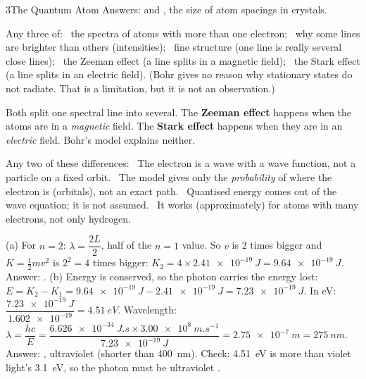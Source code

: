 \begin{chapteranswers}{3}{The Quantum Atom}
        Answers:  and
        , the size of atom spacings in crystals.
  \item Any three of:\newline
        \textbullet\ the spectra of atoms with more than one electron;\newline
        \textbullet\ why some lines are brighter than others (intensities);\newline
        \textbullet\ fine structure (one line is really several close lines);\newline
        \textbullet\ the Zeeman effect (a line splits in a magnetic field);\newline
        \textbullet\ the Stark effect (a line splits in an electric field).\newline
        (Bohr gives no reason why stationary states do not radiate. That is a limitation, but
        it is not an observation.)
  \item Both split one spectral line into several. The \textbf{Zeeman effect} happens when the
        atoms are in a \emph{magnetic} field. The \textbf{Stark effect} happens when they are in
        an \emph{electric} field. Bohr's model explains neither.
  \item Any two of these differences:\newline
        \textbullet\ The electron is a wave with a wave function, not a particle on a fixed
        orbit.\newline
        \textbullet\ The model gives only the \emph{probability} of where the electron is
        (orbitals), not an exact path.\newline
        \textbullet\ Quantised energy comes out of the wave equation; it is not assumed.\newline
        \textbullet\ It works (approximately) for atoms with many electrons, not only
        hydrogen.
  \item (a) For $n = 2$: $\lambda = \dfrac{2L}{2}$, half of the $n = 1$ value. So $v$ is 2
        times bigger and $K = \frac12 mv^2$ is $2^2 = 4$ times bigger:
        $K_2 = 4 \times \qty{2.41e-19}{J} = \qty{9.64e-19}{J}$.
        Answer: .\newline
        (b) Energy is conserved, so the photon carries the energy lost:
        $E = K_2 - K_1 = \qty{9.64e-19}{J} - \qty{2.41e-19}{J} = \qty{7.23e-19}{J}$.
        In eV: $\dfrac{\qty{7.23e-19}{J}}{\num{1.602e-19}} = \qty{4.51}{eV}$.
        Wavelength: $\lambda = \dfrac{hc}{E} = \dfrac{\qty{6.626e-34}{J.s} \times
        \qty{3.00e8}{m.s^{-1}}}{\qty{7.23e-19}{J}} = \qty{2.75e-7}{m} = \qty{275}{nm}$.
        Answer: , ultraviolet
        (shorter than \qty{400}{nm}).
        Check: \qty{4.51}{eV} is more than violet light's \qty{3.1}{eV}, so the photon must
        be ultraviolet \cmark.
\end{chapteranswers}
